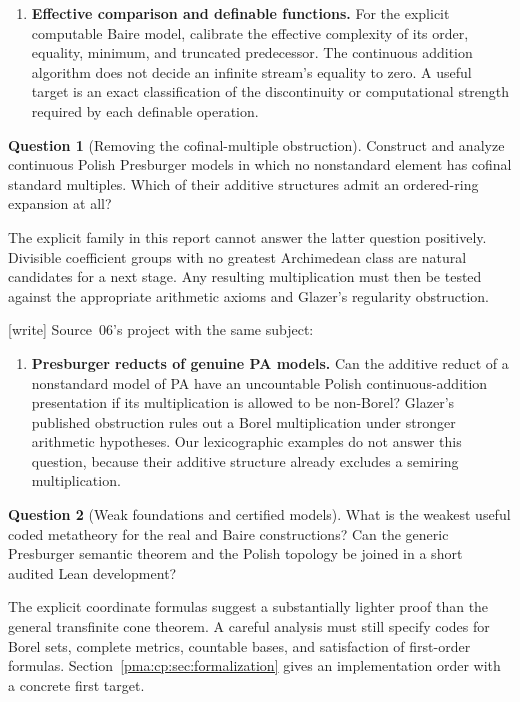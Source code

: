 \documentclass[11pt]{article}
\numberwithin{equation}{section}
\theoremstyle{definition}
\newtheorem{question}[question]{Question}
\theoremstyle{remark}
\newcommand{\writetag}{\textup{\textsf{\small[write]}}}
\begin{document}
\begin{enumerate}[label=\textbf{\arabic*.},leftmargin=*,start=9]

\item \textbf{Effective comparison and definable functions.}
For the explicit computable Baire model, calibrate the effective
complexity of its order, equality, minimum, and truncated
predecessor. The continuous addition algorithm does not decide
an infinite stream's equality to zero. A useful target is an
exact classification of the discontinuity or computational
strength required by each definable operation.

\end{enumerate}

\begin{question}[Removing the cofinal-multiple obstruction]
Construct and analyze continuous Polish Presburger models in which no
nonstandard element has cofinal standard multiples. Which of their
additive structures admit an ordered-ring expansion at all?
\end{question}
The explicit family in this report cannot answer the latter question
positively. Divisible coefficient groups with no greatest Archimedean
class are natural candidates for a next stage. Any resulting multiplication
must then be tested against the appropriate arithmetic axioms and
Glazer's regularity obstruction.

\noindent\writetag{} Source~06's project with the same subject:

\begin{enumerate}[label=\textbf{\arabic*.},leftmargin=*,start=3]

\item \textbf{Presburger reducts of genuine PA models.}
Can the additive reduct of a nonstandard model of PA have an
uncountable Polish continuous-addition presentation if its
multiplication is allowed to be non-Borel? Glazer's published
obstruction rules out a Borel multiplication under stronger
arithmetic hypotheses. Our lexicographic examples do not answer
this question, because their additive structure already excludes
a semiring multiplication.

\end{enumerate}

\begin{question}[Weak foundations and certified models]
What is the weakest useful coded metatheory for the real and Baire
constructions? Can the generic Presburger semantic theorem and the
Polish topology be joined in a short audited Lean development?
\end{question}
The explicit coordinate formulas suggest a substantially lighter proof
than the general transfinite cone theorem. A careful analysis must still
specify codes for Borel sets, complete metrics, countable bases, and
satisfaction of first-order formulas. Section~\ref{pma:cp:sec:formalization}
gives an implementation order with a concrete first target.
\end{document}
